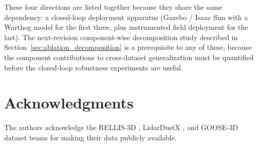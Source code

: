 \documentclass[sensors,article,submit,pdftex,moreauthors]{Definitions/mdpi}
\providecommand{\DIFadd}[1]{{\protect\color{red}#1}} %
\providecommand{\DIFaddend}{} %
\DeclareRobustCommand{\DIFaddend}{\DIFOaddend \let\includegraphics\DIFOincludegraphics} %
\begin{document}
\DIFadd{These four directions are listed together because they share the same dependency: a closed-loop deployment apparatus (Gazebo / Isaac Sim with a Warthog model for the first three, plus instrumented field deployment for the last). The next-revision component-wise decomposition study described in Section~\ref{sec:ablation_decomposition} is a prerequisite to any of these, because the component contributions to cross-dataset generalization must be quantified before the closed-loop robustness experiments are useful.
}

\DIFaddend \section*{Acknowledgments}
The authors acknowledge the RELLIS-3D \cite{jiang2021}, LidarDustX \cite{lidardust}, and GOOSE-3D \cite{goose2024} dataset teams for making their data publicly available.

\end{document}
